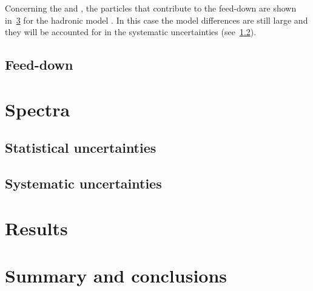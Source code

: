 Concerning the \lambs and \kzeros,
the particles that contribute to the feed-down
are shown in~\cref{} for the hadronic model \EposLong.
In this case the model differences are still
large and they will be accounted for in the systematic
uncertainties (see~\cref{sec:hadron:spec:syst}). 



\subsection{Feed-down}
\label{sec:hadron:correction:fd}




\section{Spectra}
\label{sec:hadron:spec}


\subsection{Statistical uncertainties}
\label{sec:hadron:spec:stat}


\subsection{Systematic uncertainties}
\label{sec:hadron:spec:syst}



\section{Results}

\section{Summary and conclusions}

